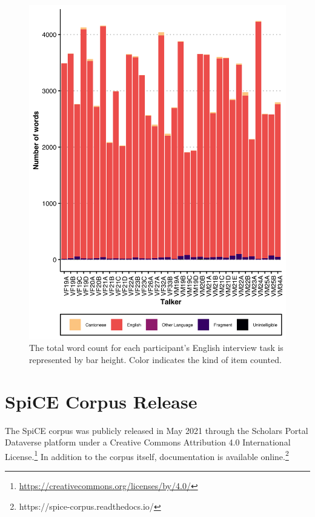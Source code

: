 \begin{figure}[!htbp]
  \begin{center}
  \includegraphics[width=4.9in]{figures/ch2_englishtypecounts_5in.png} 
  \caption{The total word count for each participant's English interview task is represented by bar height. Color indicates the kind of item counted. }
  \label{ch2:fig:englishtypecounts}
  \end{center}
\end{figure}

\section{SpiCE Corpus Release}\label{ch2:sec:releases}

The SpiCE corpus was publicly released in May 2021 through the Scholars Portal Dataverse platform under a Creative Commons Attribution 4.0 International License.\footnote{\url{https://creativecommons.org/licenses/by/4.0/}} In addition to the corpus itself, documentation is available online.\footnote{https://spice-corpus.readthedocs.io/}


